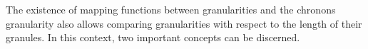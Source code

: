 %
%
%
%
%

The existence of mapping functions between granularities and the chronons granularity also allows comparing granularities with respect to the length of their granules. In this context, two important concepts can be discerned.

